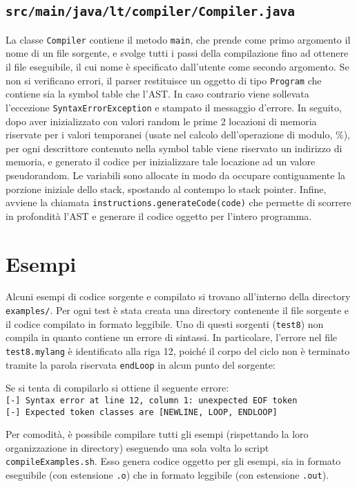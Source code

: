 \documentclass[10pt,a4paper]{article}
\begin{document}
\subsection{\texttt{src/main/java/lt/compiler/Compiler.java}}
La classe \texttt{Compiler} contiene il metodo \texttt{main}, che prende come primo argomento il nome di un file sorgente, e svolge tutti i passi della compilazione fino ad ottenere il file eseguibile, il cui nome è specificato dall'utente come secondo argomento.
Se non si verificano errori, il parser restituisce un oggetto di tipo \texttt{Program} che contiene sia la symbol table che l'AST.
In caso contrario viene sollevata l'eccezione \texttt{SyntaxErrorException} e stampato il messaggio d'errore.
In seguito, dopo aver inizializzato con valori random le prime 2 locazioni di memoria riservate per i valori temporanei (usate nel calcolo dell'operazione di modulo, $\%$), per ogni descrittore contenuto nella symbol table viene riservato un indirizzo di memoria, e generato il codice per inizializzare tale locazione ad un valore pseudorandom.
Le variabili sono allocate in modo da occupare contiguamente la porzione iniziale dello stack, spostando al contempo lo stack pointer.
Infine, avviene la chiamata \texttt{instructions.generateCode(code)} che permette di scorrere in profondità l'AST e generare il codice oggetto per l'intero programma.

\section{Esempi} \label{examples}

Alcuni esempi di codice sorgente e compilato si trovano all'interno della directory \texttt{examples/}.
Per ogni test è stata creata una directory contenente il file sorgente e il codice compilato in formato leggibile.
Uno di questi sorgenti (\texttt{test8}) non compila in quanto contiene un errore di sintassi.
In particolare, l'errore nel file \texttt{test8.mylang} è identificato alla riga 12, poiché il corpo del ciclo non è terminato tramite la parola riservata \texttt{endLoop} in alcun punto del sorgente:

\lstset{numbers=left, numberstyle=\small, numbersep=8pt, frame=leftline, xleftmargin=20pt}
\lstset{basicstyle=\ttfamily, breaklines=true, showlines=true}


Se si tenta di compilarlo si ottiene il seguente errore: \vspace{8pt}\\
\texttt{[-] Syntax error at line 12, column 1: unexpected EOF token}\\
\texttt{[-] Expected token classes are [NEWLINE, LOOP, ENDLOOP]}
\vspace{8pt}

Per comodità, è possibile compilare tutti gli esempi (rispettando la loro organizzazione in directory) eseguendo una sola volta lo script \texttt{compileExamples.sh}.
Esso genera codice oggetto per gli esempi, sia in formato eseguibile (con estensione \texttt{.o}) che in formato leggibile (con estensione \texttt{.out}).
\end{document}
